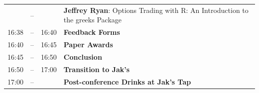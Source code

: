 \begin{tabular}{rlrp{6.1in}}
&\color{Breaks}--\hspace{-10ex}& &\textbf{\color{LightningTalk} Jeffrey Ryan}: \small{Options Trading with R: An Introduction to the greeks Package} \\
16:38&\color{Breaks}--\hspace{-10ex}& 16:40&\textbf{\color{Breaks} Feedback Forms} \\
16:40&\color{Breaks}--\hspace{-10ex}& 16:45&\textbf{\color{Breaks} Paper Awards} \\
16:45&\color{Breaks}--\hspace{-10ex}& 16:50&\textbf{\color{Breaks} Conclusion} \\
16:50&\color{Breaks}--\hspace{-10ex}& 17:00&\textbf{\color{Breaks} Transition to Jak's} \\
17:00&\color{Breaks}--\hspace{-10ex}& &\textbf{\color{Breaks} Post-conference Drinks at Jak's Tap} \\
\end{tabular}
